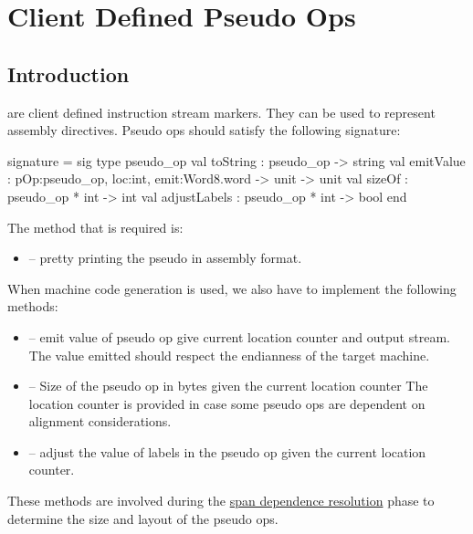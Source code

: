 \section{Client Defined Pseudo Ops}
\subsection{Introduction}
are client defined instruction stream markers.  They
can be used to represent assembly directives.
Pseudo ops should satisfy the following signature:
\begin{SML}
signature  = sig
  type pseudo_op
  val toString : pseudo_op -> string
  val emitValue : {pOp:pseudo_op, loc:int, emit:Word8.word -> unit} -> unit
  val sizeOf : pseudo_op * int -> int
  val adjustLabels : pseudo_op * int -> bool
end
\end{SML}

The method that is required is:
\begin{itemize}
 \item {} -- pretty printing the pseudo in assembly format.
\end{itemize}

When machine code generation is used, we also have to implement
the following methods:
\begin{itemize}
 \item {} --
    emit value of pseudo op give current location counter and output
    stream. The value emitted should respect the endianness of the
    target machine.
 \item {} --
    Size of the pseudo op in bytes given the current location counter
    The location counter is provided in case some pseudo ops are 
    dependent on alignment considerations.
 \item {} --
    adjust the value of labels in the pseudo op given the current
    location counter.
\end{itemize}
These methods are involved during the 
\href{span-dep.html}{span dependence resolution} phase to determine
the size and layout of the pseudo ops.
